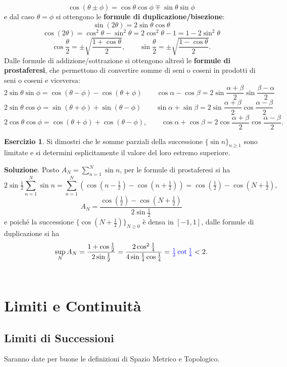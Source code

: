 \documentclass[a4paper,twoside]{article}
\theoremstyle{definition}
\newtheorem{ex}[theorem]{Esercizio}
\numberwithin{theorem}{section}
\begin{document}
$$ \cos(\theta\pm\phi)=\cos\theta\cos\phi \mp \sin\theta\sin\phi $$
e dal caso $\theta=\phi$ si ottengono le \textbf{formule di duplicazione/bisezione}:
$$ \sin(2\theta) = 2\sin\theta\cos\theta $$
$$ \cos(2\theta) = \cos^2\theta-\sin^2\theta = 2\cos^2\theta - 1 = 1-2\sin^2\theta $$
$$ \cos\frac{\theta}{2}=\pm\sqrt{\frac{1+\cos\theta}{2}},\qquad \sin\frac{\theta}{2}=\pm\sqrt{\frac{1-\cos\theta}{2}}.$$
Dalle formule di addizione/sottrazione si ottengono altresì le \textbf{formule di prostaferesi}, che permettono di convertire somme di seni o coseni in prodotti di seni o coseni e viceversa:
$$ 2\sin\theta\sin\phi = \cos(\theta-\phi)-\cos(\theta+\phi)\qquad \cos\alpha-\cos\beta = 2\sin\frac{\alpha+\beta}{2}\sin\frac{\beta-\alpha}{2} $$
$$ 2\sin\theta\cos\phi = \sin(\theta+\phi)+\sin(\theta-\phi)\qquad \sin\alpha+\sin\beta = 2\sin\frac{\alpha+\beta}{2}\cos\frac{\alpha-\beta}{2} $$
$$ 2\cos\theta\cos\phi = \cos(\theta+\phi)+\cos(\theta-\phi),\qquad \cos\alpha+\cos\beta = 2\cos\frac{\alpha+\beta}{2}\cos\frac{\alpha-\beta}{2}. $$

\begin{ex} Si dimostri che le somme parziali della successione $\{\sin n\}_{n\geq 1}$ sono limitate e si determini esplicitamente il valore del loro estremo superiore. 
\end{ex}
\textbf{Soluzione}. Posto $A_N=\sum_{n=1}^{N}\sin n$, per le formule di prostaferesi si ha 
$$ 2\sin\tfrac{1}{2}\sum_{n=1}^{N}\sin n = \sum_{n=1}^{N}\left(\cos\left(n-\tfrac{1}{2}\right)-\cos\left(n+\tfrac{1}{2}\right)\right)=\cos\left(\tfrac{1}{2}\right)-\cos\left(N+\tfrac{1}{2}\right) ,$$
$$ A_N = \frac{\cos\left(\tfrac{1}{2}\right)-\cos\left(N+\tfrac{1}{2}\right)}{2\sin\tfrac{1}{2}} $$
e poiché la successione $\{\cos\left(N+\frac{1}{2}\right)\}_{N\geq 0}$ è densa in $[-1,1]$, dalle formule di duplicazione si ha 
$$ \sup_N A_N = \frac{1+\cos\tfrac{1}{2}}{2\sin\tfrac{1}{2}} = \frac{2\cos^2\tfrac{1}{4}}{4\sin\tfrac{1}{4}\cos\tfrac{1}{4}} = {\color{blue}\tfrac{1}{2}\cot\tfrac{1}{4}}<2.$$
\\

\section{Limiti e Continuità}
\subsection{Limiti di Successioni}
Saranno date per buone le definizioni di Spazio Metrico e Topologico.
\end{document}
